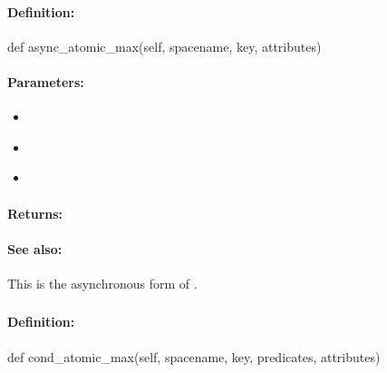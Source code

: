 \paragraph{Definition:}
\begin{pythoncode}
def async_atomic_max(self, spacename, key, attributes)
\end{pythoncode}

\paragraph{Parameters:}
\begin{itemize}[noitemsep]
\item {}\\

\item {}\\

\item {}\\

\end{itemize}

\paragraph{Returns:}


\paragraph{See also:}  This is the asynchronous form of .

\pagebreak
\subsubsection{}
\label{api:python:cond_atomic_max}


\paragraph{Definition:}
\begin{pythoncode}
def cond_atomic_max(self, spacename, key, predicates, attributes)
\end{pythoncode}

